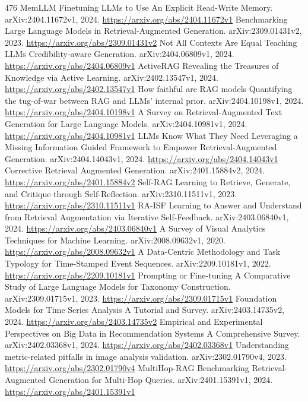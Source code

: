 \documentclass[11pt]{article}
\begin{document}
\begin{thebibliography}{476}
 MemLLM Finetuning LLMs to Use An Explicit Read-Write Memory. arXiv:2404.11672v1, 2024. \url{https://arxiv.org/abs/2404.11672v1}
 Benchmarking Large Language Models in Retrieval-Augmented Generation. arXiv:2309.01431v2, 2023. \url{https://arxiv.org/abs/2309.01431v2}
 Not All Contexts Are Equal Teaching LLMs Credibility-aware Generation. arXiv:2404.06809v1, 2024. \url{https://arxiv.org/abs/2404.06809v1}
 ActiveRAG Revealing the Treasures of Knowledge via Active Learning. arXiv:2402.13547v1, 2024. \url{https://arxiv.org/abs/2402.13547v1}
 How faithful are RAG models Quantifying the tug-of-war between RAG and LLMs' internal prior. arXiv:2404.10198v1, 2024. \url{https://arxiv.org/abs/2404.10198v1}
 A Survey on Retrieval-Augmented Text Generation for Large Language Models. arXiv:2404.10981v1, 2024. \url{https://arxiv.org/abs/2404.10981v1}
 LLMs Know What They Need Leveraging a Missing Information Guided Framework to Empower Retrieval-Augmented Generation. arXiv:2404.14043v1, 2024. \url{https://arxiv.org/abs/2404.14043v1}
 Corrective Retrieval Augmented Generation. arXiv:2401.15884v2, 2024. \url{https://arxiv.org/abs/2401.15884v2}
 Self-RAG Learning to Retrieve, Generate, and Critique through Self-Reflection. arXiv:2310.11511v1, 2023. \url{https://arxiv.org/abs/2310.11511v1}
 RA-ISF Learning to Answer and Understand from Retrieval Augmentation via Iterative Self-Feedback. arXiv:2403.06840v1, 2024. \url{https://arxiv.org/abs/2403.06840v1}
 A Survey of Visual Analytics Techniques for Machine Learning. arXiv:2008.09632v1, 2020. \url{https://arxiv.org/abs/2008.09632v1}
 A Data-Centric Methodology and Task Typology for Time-Stamped Event Sequences. arXiv:2209.10181v1, 2022. \url{https://arxiv.org/abs/2209.10181v1}
 Prompting or Fine-tuning A Comparative Study of Large Language Models for Taxonomy Construction. arXiv:2309.01715v1, 2023. \url{https://arxiv.org/abs/2309.01715v1}
 Foundation Models for Time Series Analysis A Tutorial and Survey. arXiv:2403.14735v2, 2024. \url{https://arxiv.org/abs/2403.14735v2}
 Empirical and Experimental Perspectives on Big Data in Recommendation Systems A Comprehensive Survey. arXiv:2402.03368v1, 2024. \url{https://arxiv.org/abs/2402.03368v1}
 Understanding metric-related pitfalls in image analysis validation. arXiv:2302.01790v4, 2023. \url{https://arxiv.org/abs/2302.01790v4}
 MultiHop-RAG Benchmarking Retrieval-Augmented Generation for Multi-Hop Queries. arXiv:2401.15391v1, 2024. \url{https://arxiv.org/abs/2401.15391v1}

\end{thebibliography}
\end{document}
